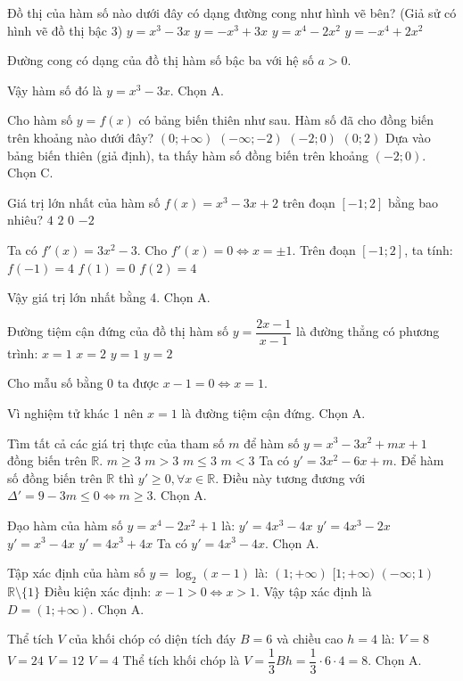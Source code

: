 
\caugiai
{
Đồ thị của hàm số nào dưới đây có dạng đường cong như hình vẽ bên?
(Giả sử có hình vẽ đồ thị bậc 3)
\bonpa
{\(y=x^3-3x\)}
{\(y=-x^3+3x\)}
{\(y=x^4-2x^2\)}
{\(y=-x^4+2x^2\)}
}
{
Đường cong có dạng của đồ thị hàm số bậc ba với hệ số \(a>0\). 

Vậy hàm số đó là \(y=x^3-3x\). Chọn A.
}

\caugiai
{
Cho hàm số \(y=f(x)\) có bảng biến thiên như sau. Hàm số đã cho đồng biến trên khoảng nào dưới đây?
\bonpa
{\((0;+\infty)\)}
{\((-\infty;-2)\)}
{\((-2;0)\)}
{\((0;2)\)}
}
{
Dựa vào bảng biến thiên (giả định), ta thấy hàm số đồng biến trên khoảng \((-2;0)\). Chọn C.
}

\caugiai
{
Giá trị lớn nhất của hàm số \(f(x) = x^3 - 3x + 2\) trên đoạn \([-1; 2]\) bằng bao nhiêu?
\bonpa
{\(4\)}
{\(2\)}
{\(0\)}
{\(-2\)}
}
{
Ta có \(f'(x) = 3x^2 - 3\). Cho \(f'(x) = 0 \Leftrightarrow x = \pm 1\).
Trên đoạn \([-1; 2]\), ta tính:
\(f(-1) = 4\)
\(f(1) = 0\)
\(f(2) = 4\)

Vậy giá trị lớn nhất bằng 4. Chọn A.
}

\caugiai
{
Đường tiệm cận đứng của đồ thị hàm số \(y=\dfrac{2x-1}{x-1}\) là đường thẳng có phương trình:
\bonpa
{\(x=1\)}
{\(x=2\)}
{\(y=1\)}
{\(y=2\)}
}
{
Cho mẫu số bằng 0 ta được \(x-1=0 \Leftrightarrow x=1\). 

Vì nghiệm tử khác 1 nên \(x=1\) là đường tiệm cận đứng. Chọn A.
}

\caugiai
{
Tìm tất cả các giá trị thực của tham số \(m\) để hàm số \(y=x^3-3x^2+mx+1\) đồng biến trên \(\mathbb{R}\).
\bonpa
{\(m \ge 3\)}
{\(m > 3\)}
{\(m \le 3\)}
{\(m < 3\)}
}
{
Ta có \(y'=3x^2-6x+m\).
Để hàm số đồng biến trên \(\mathbb{R}\) thì \(y' \ge 0, \forall x \in \mathbb{R}\).
Điều này tương đương với \(\Delta' = 9 - 3m \le 0 \Leftrightarrow m \ge 3\). Chọn A.
}

\caugiai
{
Đạo hàm của hàm số \(y = x^4 - 2x^2 + 1\) là:
\bonpa
{\(y' = 4x^3 - 4x\)}
{\(y' = 4x^3 - 2x\)}
{\(y' = x^3 - 4x\)}
{\(y' = 4x^3 + 4x\)}
}
{
Ta có \(y' = 4x^3 - 4x\). Chọn A.
}

\caugiai
{
Tập xác định của hàm số \(y = \log_2(x-1)\) là:
\bonpa
{\((1; +\infty)\)}
{\([1; +\infty)\)}
{\((-\infty; 1)\)}
{\(\mathbb{R} \setminus \{1\}\)}
}
{
Điều kiện xác định: \(x-1 > 0 \Leftrightarrow x > 1\). 
Vậy tập xác định là \(D = (1; +\infty)\). Chọn A.
}

\caugiai
{
Thể tích \(V\) của khối chóp có diện tích đáy \(B=6\) và chiều cao \(h=4\) là:
\bonpa
{\(V = 8\)}
{\(V = 24\)}
{\(V = 12\)}
{\(V = 4\)}
}
{
Thể tích khối chóp là \(V = \dfrac{1}{3}Bh = \dfrac{1}{3} \cdot 6 \cdot 4 = 8\). Chọn A.
}

